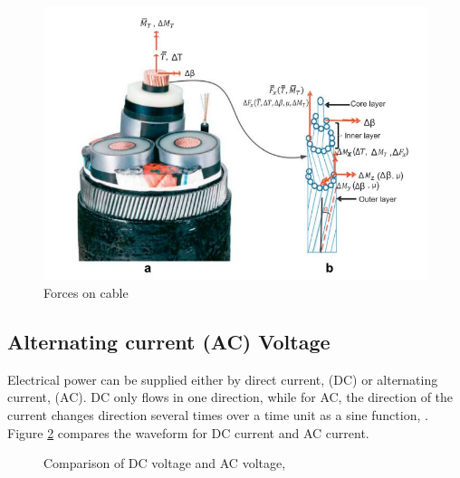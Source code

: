 \begin{figure}[H]
\centering
\includegraphics[scale=0.8]{figures/cable}
\caption[$\; \:$Forces on cable]{Forces on cable  \cite{Nasution2013} }
 \label{fig:cable}
\end{figure}

\subsection{Alternating current (AC) Voltage}
Electrical power can be supplied either by direct current, (DC) or alternating current, (AC). DC only flows in one direction, while for AC, the direction of the current changes direction several times over a time unit as a sine function, \cite{Dale2000}. Figure \ref{fig:acdc} compares the waveform for DC current and AC current.


\begin{figure}[H]
\hfill
{}\hfill
\caption[$\; \:$Comparison of DC voltage and AC voltage]{Comparison of DC voltage and AC voltage, \cite{Dale2000}}
\label{fig:acdc}
\end{figure}

